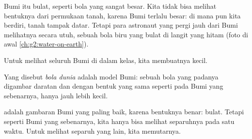 Bumi itu bulat, seperti bola yang sangat besar. Kita tidak bisa melihat
bentuknya dari permukaan tanah, karena Bumi terlalu besar: di mana pun kita
berdiri, tanah tampak datar. Tetapi para astronaut yang pergi jauh dari
Bumi melihatnya secara utuh, sebuah bola biru yang bulat di langit yang
hitam (foto di awal \cref{ch:g2:water-on-earth}).

Untuk melihat seluruh Bumi di dalam kelas, kita membuatnya kecil.

\begin{definition}\label{def:g3:continents-and-oceans:globe}
Yang disebut \emph{bola dunia} adalah model Bumi: sebuah
bola yang padanya digambar daratan dan  dengan bentuk yang sama
seperti pada Bumi yang sebenarnya, hanya jauh lebih kecil.
\end{definition}

 adalah gambaran Bumi yang paling baik, karena bentuknya benar:
bulat. Tetapi seperti Bumi yang sebenarnya, kita hanya bisa melihat
separuhnya pada satu waktu. Untuk melihat separuh yang lain, kita
memutarnya.


